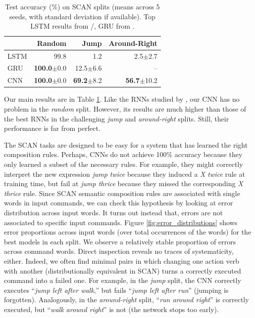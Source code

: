 \begin{table}[tb]
  \begin{footnotesize}
    \begin{center}
          \begin{tabular}{l | r | r | r}
             & \textbf{Random} & \textbf{Jump} & \textbf{Around-Right} \\ \hline
             LSTM & 99.8 & 1.2 & 2.5$\pm$2.7 \\
             GRU & \textbf{100.0}$\pm$0.0 & 12.5$\pm$6.6 & --  \\
             \hline
              CNN & \textbf{100.0}$\pm$0.0 & \textbf{69.2}$\pm$8.2 & \textbf{56.7}$\pm$10.2 \\
          \end{tabular} 
    \end{center}
  \end{footnotesize}
  \caption{Test accuracy (\%) on SCAN splits (means across 5 seeds,
    with standard deviation if available). Top LSTM results from
    /, GRU from
      .}
\label{table:main_results} 
\end{table}

Our main results are in Table \ref{table:main_results}. Like the
RNNs studied by , our CNN has no problem in
the \emph{random} split. However, its results are much higher than
those of the best RNNs in the challenging \emph{jump} and
\emph{around-right} splits. Still, their performance is far from perfect.

The SCAN tasks are designed to be easy for a system that has learned
the right composition rules. Perhaps, CNNs do not achieve 100\%
accuracy because they only learned a subset of the necessary
rules. For example, they might correctly interpret the new
expression \emph{jump twice} because they induced a \emph{X twice}
rule at training time, but fail at \emph{jump
  thrice} because they missed the corresponding \emph{X
  thrice} rule. Since SCAN semantic composition rules are associated
with single words in input commands, we can check this hypothesis by
looking at error distribution across input words. It turns out instead that,
errors are not associated to specific input commands.  Figure
\ref{fig:error_distributions} shows error proportions across input
words (over total occurrences of the words) for the best models in
each split. We observe a relatively stable proportion of errors across
command words. Direct inspection reveals no traces of
systematicity, either. Indeed, we often find minimal pairs in which changing
one action verb with another (distributionally equivalent in SCAN)
turns a correctly executed command into a failed one. For
example, in the \emph{jump} split, the CNN correctly executes
``\emph{jump left after walk},'' but fails ``\emph{jump left after
  run}'' (jumping is forgotten). Analogously, in the
\emph{around-right} split, ``\emph{run around right}'' is correctly
executed, but ``\emph{walk around right}'' is not (the network stops too
early).

